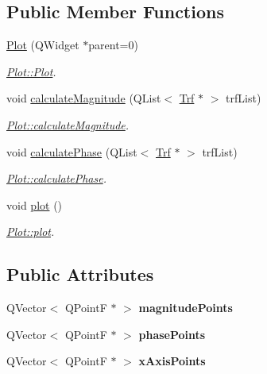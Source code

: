 \subsection*{Public Member Functions}
\begin{DoxyCompactItemize}
\item 
\hyperlink{classPlot_acb95c0d3a6d1d4edf7b946863efdac98}{Plot} (Q\+Widget $\ast$parent=0)
\begin{DoxyCompactList}\small\item\em \hyperlink{classPlot_acb95c0d3a6d1d4edf7b946863efdac98}{Plot\+::\+Plot}. \end{DoxyCompactList}\item 
void \hyperlink{classPlot_a1c6fda8fe644da0e0f0df6bf659455de}{calculate\+Magnitude} (Q\+List$<$ \hyperlink{classTrf}{Trf} $\ast$ $>$ trf\+List)
\begin{DoxyCompactList}\small\item\em \hyperlink{classPlot_a1c6fda8fe644da0e0f0df6bf659455de}{Plot\+::calculate\+Magnitude}. \end{DoxyCompactList}\item 
void \hyperlink{classPlot_afaf47513d7e2390b1c51df94a43a025e}{calculate\+Phase} (Q\+List$<$ \hyperlink{classTrf}{Trf} $\ast$ $>$ trf\+List)
\begin{DoxyCompactList}\small\item\em \hyperlink{classPlot_afaf47513d7e2390b1c51df94a43a025e}{Plot\+::calculate\+Phase}. \end{DoxyCompactList}\item 
void \hyperlink{classPlot_a8fae6078f872f751aa80d1f037266438}{plot} ()
\begin{DoxyCompactList}\small\item\em \hyperlink{classPlot_a8fae6078f872f751aa80d1f037266438}{Plot\+::plot}. \end{DoxyCompactList}\end{DoxyCompactItemize}
\subsection*{Public Attributes}
\begin{DoxyCompactItemize}
\item 
\hypertarget{classPlot_a25d9ba7cbbbb6af4be2fb5c51eb215fc}{}Q\+Vector$<$ Q\+Point\+F $\ast$ $>$ {\bfseries magnitude\+Points}\label{classPlot_a25d9ba7cbbbb6af4be2fb5c51eb215fc}

\item 
\hypertarget{classPlot_a7e4bee81b3be186f4ab225f75214c11b}{}Q\+Vector$<$ Q\+Point\+F $\ast$ $>$ {\bfseries phase\+Points}\label{classPlot_a7e4bee81b3be186f4ab225f75214c11b}

\item 
\hypertarget{classPlot_afdafdfe7409511731d871b9353f815e4}{}Q\+Vector$<$ Q\+Point\+F $\ast$ $>$ {\bfseries x\+Axis\+Points}\label{classPlot_afdafdfe7409511731d871b9353f815e4}

\end{DoxyCompactItemize}


